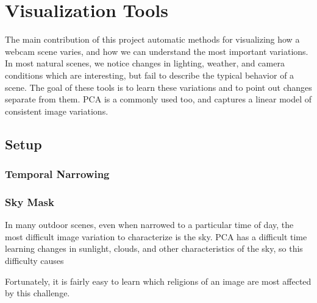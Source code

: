 \chapter{Visualization Tools}
\label{cpt:tools}

The main contribution of this project automatic methods for visualizing how a webcam
scene varies, and how we can understand the most important variations.  In most natural
scenes, we notice changes in lighting, weather, and camera conditions which are interesting,
but fail to describe the typical behavior of a scene.  The goal of these tools is to learn 
these variations and to point out changes separate from them.  PCA is a commonly used too, and
captures a linear model of consistent image variations.

\section{Setup}

\subsection{Temporal Narrowing}

\subsection{Sky Mask}

In many outdoor scenes, even when narrowed to a particular time of day, the most difficult image
variation to characterize is the sky.  PCA has a difficult time learning changes in sunlight, clouds,
and other characteristics of the sky, so this difficulty causes

Fortunately, it is fairly easy to learn which religions of an image are most affected by this challenge.


